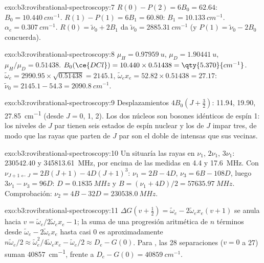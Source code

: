 \begin{solution}{exo:b3:rovibrational-spectroscopy:7}
$R(0) - P(2) = 6B_0 = 62.64$: $B_0 = \qty{10.440}{cm^{-1}}$. $R(1) - P(1) = 6B_1 = 60.80$:
$B_1 = \qty{10.133}{cm^{-1}}$. $\alpha_e = \qty{0.307}{cm^{-1}}$. $R(0) = \tilde\nu_0 + 2B_1$ da
$\tilde\nu_0 = \qty{2885.31}{cm^{-1}}$ (y $P(1) = \tilde\nu_0 - 2B_0$ concuerda).
\end{solution}

\begin{solution}{exo:b3:rovibrational-spectroscopy:8}
$\mu_H = \qty{0.97959}{u}$, $\mu_D = \qty{1.90441}{u}$, $\mu_H/\mu_D = 0.51438$. $B_0(\ce{DCl})
= 10.440 \times 0.51438 = \qty{5.370}{cm^{-1}}$. $\tilde\omega_e = 2990.95 \times \sqrt{0.51438}
= 2145.1$, $\tilde\omega_ex_e = 52.82 \times 0.51438 = 27.17$: $\tilde\nu_0 = 2145.1 - 54.3 =
\qty{2090.8}{cm^{-1}}$.
\end{solution}

\begin{solution}{exo:b3:rovibrational-spectroscopy:9}
Desplazamientos $4B_0(J + \frac32)$: 11.94, 19.90, \qty{27.85}{cm^{-1}} (desde $J = 0$, 1, 2). Los
dos núcleos  son bosones idénticos de espín 1: los niveles de $J$ par tienen seis
estados de espín nuclear y los de $J$ impar tres, de modo que las rayas que parten de $J$ par son el doble de
intensas que sus vecinas.
\end{solution}

\begin{solution}{exo:b3:rovibrational-spectroscopy:10}
Un  situaría las rayas en $\nu_1$, $2\nu_1$, $3\nu_1$: $230542.40$ y
\qty{345813.61}{MHz}, por encima de las medidas en 4.4 y \qty{17.6}{MHz}. Con
$\nu_{J+1\leftarrow J} = 2B(J+1) - 4D(J+1)^3$: $\nu_1 = 2B - 4D$, $\nu_3 = 6B - 108D$, luego
$3\nu_1 - \nu_3 = 96D$: $D = \qty{0.1835}{MHz}$ y $B = (\nu_1 + 4D)/2 =
\qty{57635.97}{MHz}$. Comprobación: $\nu_2 = 4B - 32D = \qty{230538.0}{MHz}$.
\end{solution}

\begin{solution}{exo:b3:rovibrational-spectroscopy:11}
$\Delta G(v + \frac12) = \tilde\omega_e - 2\tilde\omega_ex_e(v+1)$ se anula hacia $v =
\tilde\omega_e/2\tilde\omega_ex_e - 1$; la suma de una progresión aritmética de $n$ términos
desde $\tilde\omega_e - 2\tilde\omega_ex_e$ hasta casi 0 es aproximadamente $n\tilde\omega_e/2 \approx
\tilde\omega_e^2/4\tilde\omega_ex_e - \tilde\omega_e/2 \approx D_e - G(0)$. Para , las 28 separaciones
($v = 0$ a 27) suman \qty{40857}{cm^{-1}}, frente a $D_e - G(0) = \qty{40859}{cm^{-1}}$.
\end{solution}

